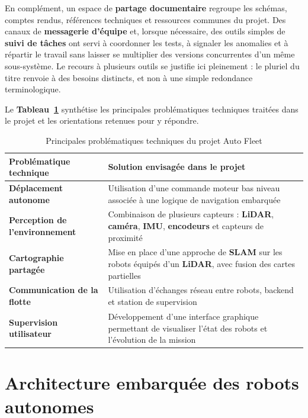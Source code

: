 \documentclass[11pt,a4paper]{report}
\newcommand{\kw}[1]{\textbf{#1}}
\begin{document}
En complément, un espace de \kw{partage documentaire} regroupe les schémas, comptes rendus, références techniques et ressources communes du projet. Des canaux de \kw{messagerie d’équipe} et, lorsque nécessaire, des outils simples de \kw{suivi de tâches} ont servi à coordonner les tests, à signaler les anomalies et à répartir le travail sans laisser se multiplier des versions concurrentes d’un même sous-système. Le recours à plusieurs outils se justifie ici pleinement : le pluriel du titre renvoie à des besoins distincts, et non à une simple redondance terminologique.

Le \kw{Tableau~\ref{tab:problematiques_techniques}} synthétise les principales problématiques techniques traitées dans le projet et les orientations retenues pour y répondre.

\begin{table}[H]
\centering
\renewcommand{\arraystretch}{1.35}
\begin{tabular}{|p{5cm}|p{10cm}|}
\hline
\textbf{Problématique technique} & \textbf{Solution envisagée dans le projet} \\
\hline
\kw{Déplacement autonome} & Utilisation d'une commande moteur bas niveau associée à une logique de navigation embarquée \\
\hline
\kw{Perception de l'environnement} & Combinaison de plusieurs capteurs : \kw{LiDAR}, \kw{caméra}, \kw{IMU}, \kw{encodeurs} et capteurs de proximité \\
\hline
\kw{Cartographie partagée} & Mise en place d'une approche de \kw{SLAM} sur les robots équipés d'un \kw{LiDAR}, avec fusion des cartes partielles \\
\hline
\kw{Communication de la flotte} & Utilisation d'échanges réseau entre robots, backend et station de supervision \\
\hline
\kw{Supervision utilisateur} & Développement d'une interface graphique permettant de visualiser l'état des robots et l'évolution de la mission \\
\hline
\end{tabular}
\caption{Principales problématiques techniques du projet Auto Fleet}
\label{tab:problematiques_techniques}
\end{table}

\chapter{Architecture embarquée des robots autonomes}
\end{document}
